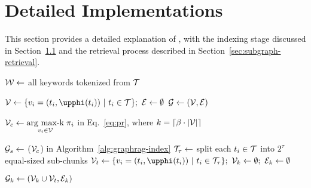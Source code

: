 \section{Detailed Implementations}\label{sec:details}
This section provides a detailed explanation of \sketrag, with the indexing stage \sketindex discussed in Section~\ref{sec:graph-construct} and the retrieval process \sketretrieval described in Section~\ref{sec:subgraph-retrieval}.


\begin{algorithm}[!t]

$\mathcal{W} \gets$ all keywords tokenized from $\mathcal{T}$\;

$\V \gets \{v_i = (t_i, \temb{t_i}) ~|~ t_i \in \Tset\}; ~ \E \gets \emptyset$\;
$\mathcal{G} \gets (\mathcal{V}, \mathcal{E})$\;

$\mathcal{V}_c \gets \underset{v_i\in \mathcal{V}}{\operatorname{arg}\,\operatorname{max-k}}\; \pi_i$ in Eq.~\eqref{eq:pr}, where $k=\lceil \beta \cdot |\mathcal{V}| \rceil$\;

$\mathcal{G}_s \gets $ \graphindex ($\mathcal{V}_c$) in Algorithm~\ref{alg:graphrag-index}\;
$\mathcal{T}_{\tau} \gets$ split each $t_i \in \mathcal{T}$ into $2^{\tau}$ equal-sized sub-chunks\;
$\V_t \gets \{v_i = (t_i, \temb{t_i}) ~|~ t_i \in \Tset_{\tau}\}; ~ \V_k \gets \emptyset; ~ \E_k \gets \emptyset$\;

$\mathcal{G}_k \gets (\mathcal{V}_k \cup \mathcal{V}_t, \mathcal{E}_k)$\;
\caption{\sketindex$(\Tset, K, \beta, \tau)$}
\label{alg:sketrag-index}
\end{algorithm}

\subsection{\sketindex}\label{sec:graph-construct}

